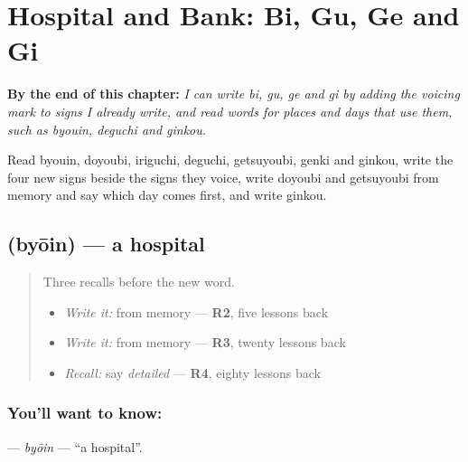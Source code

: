 
\chapter{Hospital and Bank: Bi, Gu, Ge and Gi}
\label{ch:ja-hospital-and-bank-bi-gu-ge-gi}

\begin{chapteropening}
\textbf{By the end of this chapter:} \emph{I can write bi, gu, ge and gi by adding the voicing mark to signs I already write, and read words for places and days that use them, such as byouin, deguchi and ginkou.}

Read byouin, doyoubi, iriguchi, deguchi, getsuyoubi, genki and ginkou, write the four new signs beside the signs they voice, write doyoubi and getsuyoubi from memory and say which day comes first, and write ginkou.
\end{chapteropening}

\section[\texorpdfstring{\ja{びょういん} (byōin)}{びょういん (byōin)}]{ (byōin) — a hospital}

\label{lesson:JA-C135-byouin}



\begin{quote}
Three recalls before the new word.

\begin{itemize}
\raggedright
  \item \emph{Write it:} \textbf{} from memory — \textbf{R2}, five lessons back
  \item \emph{Write it:} \textbf{} from memory — \textbf{R3}, twenty lessons back
  \item \emph{Recall:} say \emph{detailed} — \textbf{R4}, eighty lessons back
\end{itemize}
\end{quote}

\subsection*{You'll want to know: }
\textbf{} — \emph{byōin} — \textquotedblleft{}a hospital\textquotedblright{}.

